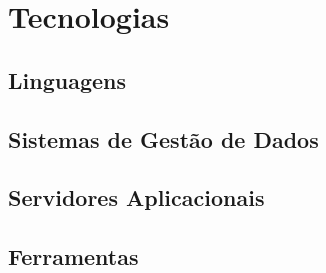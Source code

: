 \chapter{Tecnologias}
\label{ch:tecnologias}


\section{Linguagens}
\label{sec:linguagens}


\section{Sistemas de Gestão de Dados}
\label{sec:sistemagestaodados}


\section{Servidores Aplicacionais}
\label{sec:servidoresaplicacionais}


\section{Ferramentas}
\label{sec:ferramentas}